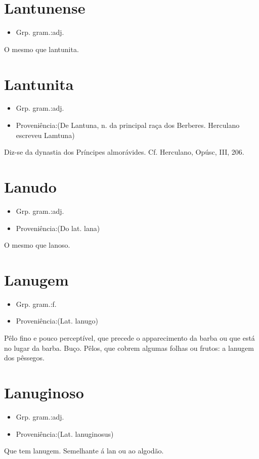 \section{Lantunense}
\begin{itemize}
\item {Grp. gram.:adj.}
\end{itemize}
O mesmo que \textunderscore lantunita\textunderscore .
\section{Lantunita}
\begin{itemize}
\item {Grp. gram.:adj.}
\end{itemize}
\begin{itemize}
\item {Proveniência:(De \textunderscore Lantuna\textunderscore , n. da principal raça dos Berberes. Herculano escreveu \textunderscore Lamtuna\textunderscore )}
\end{itemize}
Diz-se da dynastia dos Príncipes almorávides. Cf. Herculano, \textunderscore Opúsc\textunderscore , III, 206.
\section{Lanudo}
\begin{itemize}
\item {Grp. gram.:adj.}
\end{itemize}
\begin{itemize}
\item {Proveniência:(Do lat. \textunderscore lana\textunderscore )}
\end{itemize}
O mesmo que \textunderscore lanoso\textunderscore .
\section{Lanugem}
\begin{itemize}
\item {Grp. gram.:f.}
\end{itemize}
\begin{itemize}
\item {Proveniência:(Lat. \textunderscore lanugo\textunderscore )}
\end{itemize}
Pêlo fino e pouco perceptível, que precede o apparecimento da barba ou que está no lugar da barba.
Buço.
Pêlos, que cobrem algumas folhas ou frutos: \textunderscore a lanugem dos pêssegos\textunderscore .
\section{Lanuginoso}
\begin{itemize}
\item {Grp. gram.:adj.}
\end{itemize}
\begin{itemize}
\item {Proveniência:(Lat. \textunderscore lanuginosus\textunderscore )}
\end{itemize}
Que tem lanugem.
Semelhante á lan ou ao algodão.
